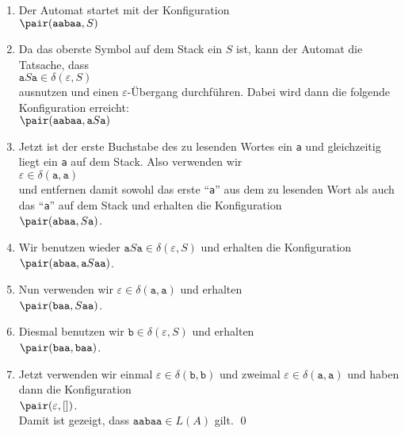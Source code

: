 \begin{enumerate}
\item Der Automat startet mit der Konfiguration
      \\[0.2cm]
      \hspace*{1.3cm}
      $\pair(\texttt{aabaa},S)$ 
\item Da das oberste Symbol auf dem Stack ein $S$ ist, kann der Automat die Tatsache, dass
      \\[0.2cm]
      \hspace*{1.3cm}
      $\texttt{a}S\texttt{a} \in \delta(\varepsilon,S)$
      \\[0.2cm]
      ausnutzen und einen $\varepsilon$-\"Ubergang durchf\"uhren.  Dabei wird dann die
      folgende Konfiguration erreicht:
      \\[0.2cm]
      \hspace*{1.3cm}
      $\pair(\texttt{aabaa},\texttt{a}S\texttt{a})$
\item Jetzt ist der erste Buchstabe des zu lesenden Wortes ein \texttt{a} und gleichzeitig
      liegt ein \texttt{a} auf dem Stack.  Also verwenden wir
      \\[0.2cm]
      \hspace*{1.3cm}
      $\varepsilon \in \delta(\texttt{a}, \texttt{a})$
      \\[0.2cm]
      und entfernen damit sowohl das erste ``\texttt{a}'' aus dem zu lesenden Wort als
      auch das ``\texttt{a}'' auf dem Stack und erhalten die Konfiguration
      \\[0.2cm]
      \hspace*{1.3cm}
      $\pair(\texttt{abaa}, S\texttt{a})$.
\item Wir benutzen wieder $\texttt{a}S\texttt{a} \in \delta(\varepsilon,S)$ und erhalten
      die Konfiguration
      \\[0.2cm]
      \hspace*{1.3cm}
      $\pair(\texttt{abaa}, \texttt{a}S\texttt{aa})$.
\item Nun verwenden wir $\varepsilon \in \delta(\texttt{a}, \texttt{a})$ und erhalten
      \\[0.2cm]
      \hspace*{1.3cm}
      $\pair(\texttt{baa}, S\texttt{aa})$.
\item Diesmal benutzen wir $\texttt{b} \in \delta(\varepsilon,S)$ und erhalten
      \\[0.2cm]
      \hspace*{1.3cm}
      $\pair(\texttt{baa}, \texttt{baa})$.
\item Jetzt verwenden wir einmal $\varepsilon \in \delta(\texttt{b}, \texttt{b})$ und zweimal
      $\varepsilon \in \delta(\texttt{a}, \texttt{a})$ und haben dann die Konfiguration
      \\[0.2cm]
      \hspace*{1.3cm}
      $\pair(\varepsilon, [])$.
      \\[0.2cm]
      Damit ist  gezeigt, dass $\texttt{aabaa} \in L(A)$ gilt. \qed
\end{enumerate}

